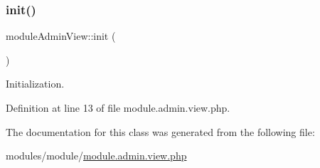\mbox{\label{classmoduleAdminView_a9b5d1a3f7dc566edd3c5f381e19438b7}} 
\subsubsection{\texorpdfstring{init()}{init()}}
{\footnotesize\ttfamily module\+Admin\+View\+::init (\begin{DoxyParamCaption}{ }\end{DoxyParamCaption})}



Initialization. 



Definition at line 13 of file module.\+admin.\+view.\+php.



The documentation for this class was generated from the following file\+:\begin{DoxyCompactItemize}
\item 
modules/module/\hyperlink{module_8admin_8view_8php}{module.\+admin.\+view.\+php}\end{DoxyCompactItemize}
